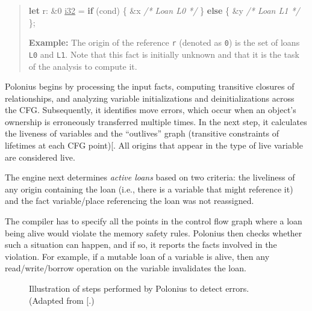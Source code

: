 \documentclass[
  11pt,
  twoside]{report}
\newenvironment{Shaded}{}{}
\newcommand{\CharTok}[1]{#1}
\newcommand{\CommentTok}[1]{\textit{#1}}
\newcommand{\ControlFlowTok}[1]{\textbf{#1}}
\newcommand{\DataTypeTok}[1]{\underline{#1}}
\newcommand{\DecValTok}[1]{#1}
\newcommand{\KeywordTok}[1]{\textbf{#1}}
\newcommand{\NormalTok}[1]{#1}
\newcommand{\OperatorTok}[1]{#1}
\begin{document}
\begin{quote}
\begin{Shaded}
\begin{Highlighting}[]
\KeywordTok{let}\NormalTok{ r}\OperatorTok{:} \OperatorTok{\&}\CharTok{\textquotesingle{}}\DecValTok{0} \DataTypeTok{i32} \OperatorTok{=} \ControlFlowTok{if}\NormalTok{ (cond) }\OperatorTok{\{}
    \OperatorTok{\&}\NormalTok{x }\CommentTok{/* Loan L0 */}
\OperatorTok{\}} \ControlFlowTok{else} \OperatorTok{\{}
    \OperatorTok{\&}\NormalTok{y }\CommentTok{/* Loan L1 */}
\OperatorTok{\};}
\end{Highlighting}
\end{Shaded}

\textbf{Example:} The origin of the reference \texttt{r} (denoted as
\texttt{\textquotesingle{}0}) is the set of loans \texttt{L0} and
\texttt{L1}. Note that this fact is initially unknown and that it is the
task of the analysis to compute it.
\end{quote}

Polonius begins by processing the input facts, computing transitive
closures of relationships, and analyzing variable initializations and
deinitializations across the CFG. Subsequently, it identifies move
errors, which occur when an object's ownership is erroneously
transferred multiple times. In the next step, it calculates the liveness
of variables and the ``outlives'' graph (transitive constraints of
lifetimes at each CFG point){[}\citeproc{ref-polonius2}{9}{]}. All
origins that appear in the type of live variable are considered live.

The engine next determines \emph{active loans} based on two criteria:
the liveliness of any origin containing the loan (i.e., there is a
variable that might reference it) and the fact variable/place
referencing the loan was not reassigned.

The compiler has to specify all the points in the control flow graph
where a loan being alive would violate the memory safety rules. Polonius
then checks whether such a situation can happen, and if so, it reports
the facts involved in the violation. For example, if a mutable loan of a
variable is alive, then any read/write/borrow operation on the variable
invalidates the loan.

\begin{figure}
\centering

\caption{Illustration of steps performed by Polonius to detect errors.
(Adapted from {[}\citeproc{ref-Stjerna2020}{8}{]}.)}
\end{figure}
\end{document}
